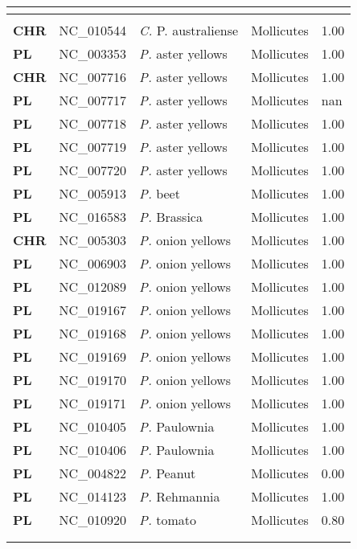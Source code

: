\begin{adjustwidth}{-3cm}{2cm}
{\begin{supertabular}{>{\bfseries}l|p{0.1\textwidth}p{0.14\textwidth}l|l}
\\
\hline\\
CHR & NC\_010544 & \textit{C.} P. australiense & Mollicutes & 1.00\\
PL & NC\_003353 & \textit{P.} aster yellows & Mollicutes & 1.00\\
CHR & NC\_007716 & \textit{P.} aster yellows & Mollicutes & 1.00\\
PL & NC\_007717 & \textit{P.} aster yellows & Mollicutes & nan\\
PL & NC\_007718 & \textit{P.} aster yellows & Mollicutes & 1.00\\
PL & NC\_007719 & \textit{P.} aster yellows & Mollicutes & 1.00\\
PL & NC\_007720 & \textit{P.} aster yellows & Mollicutes & 1.00\\
PL & NC\_005913 & \textit{P.} beet & Mollicutes & 1.00\\
PL & NC\_016583 & \textit{P.} Brassica & Mollicutes & 1.00\\
CHR & NC\_005303 & \textit{P.} onion yellows  & Mollicutes & 1.00\\
PL & NC\_006903 & \textit{P.} onion yellows & Mollicutes & 1.00\\
PL & NC\_012089 & \textit{P.} onion yellows & Mollicutes & 1.00\\
PL & NC\_019167 & \textit{P.} onion yellows & Mollicutes & 1.00\\
PL & NC\_019168 & \textit{P.} onion yellows & Mollicutes & 1.00\\
PL & NC\_019169 & \textit{P.} onion yellows & Mollicutes & 1.00\\
PL & NC\_019170 & \textit{P.} onion yellows & Mollicutes & 1.00\\
PL & NC\_019171 & \textit{P.} onion yellows & Mollicutes & 1.00\\
PL & NC\_010405 & \textit{P.} Paulownia & Mollicutes & 1.00\\
PL & NC\_010406 & \textit{P.} Paulownia & Mollicutes & 1.00\\
PL & NC\_004822 & \textit{P.} Peanut & Mollicutes & 0.00\\
PL & NC\_014123 & \textit{P.} Rehmannia & Mollicutes & 1.00\\
PL & NC\_010920 & \textit{P.} tomato & Mollicutes & 0.80\\
\\
\\

\end{supertabular}}
\end{adjustwidth}
